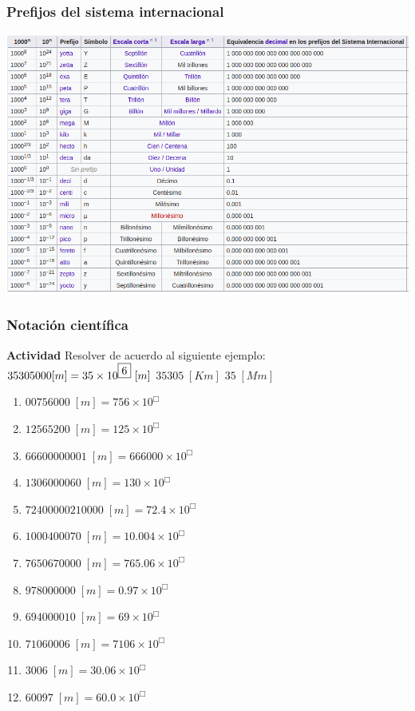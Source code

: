 \documentclass[11pt]{article}
\theoremstyle{definition}
\begin{document}
\subsubsection{Prefijos del sistema internacional}

\includegraphics[scale=0.5]{img/prefijos.png}

\subsubsection{Notación científica}

\begin{myblock}{\textbf{Actividad }}
    Resolver de acuerdo al siguiente ejemplo: \\
    $35305000 [m] = 35 \times 10^{\fbox{6}} \;[m] $ \quad $35305 \;[Km]$ \quad $ 35 \;[Mm] $ \\ 
    
    \begin{multicols}{2} 
        \begin{enumerate}
            \item $00756000 \;[m] = 756 \times 10^\Box$
            \item $12565200 \;[m] = 125 \times 10^\Box$
            \item $66600000001 \;[m] = 666000 \times 10^\Box$
            \item $1306000060 \;[m] = 130 \times 10^\Box$
            \item $72400000210000 \;[m] = 72.4 \times 10^\Box$
            \item $1000400070 \;[m] = 10.004 \times 10^\Box$
            \item $7650670000 \;[m] = 765.06 \times 10^\Box$
            \item $978000000 \;[m] = 0.97 \times 10^\Box$
            \item $694000010 \;[m] = 69 \times 10^\Box$
            \item $71060006 \;[m] = 7106 \times 10^\Box$
            \item $3006 \;[m] = 30.06 \times 10^\Box$
            \item $60097 \;[m] = 60.0 \times 10^\Box$
        \end{enumerate}
    \end{multicols}
\end{myblock}
\end{document}
